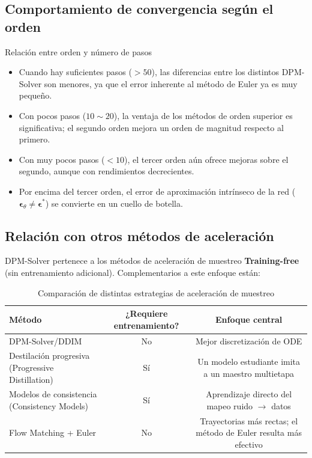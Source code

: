\documentclass[a4paper]{article}
\begin{document}
\subsection{Comportamiento de convergencia según el orden}

\begin{knowledgebox}{Relación entre orden y número de pasos}
\begin{itemize}
    \item Cuando hay suficientes pasos ($>50$), las diferencias entre los distintos DPM-Solver son menores, ya que el error inherente al método de Euler ya es muy pequeño.
    \item Con pocos pasos ($10\sim 20$), la ventaja de los métodos de orden superior es significativa; el segundo orden mejora un orden de magnitud respecto al primero.
    \item Con muy pocos pasos ($<10$), el tercer orden aún ofrece mejoras sobre el segundo, aunque con rendimientos decrecientes.
    \item Por encima del tercer orden, el error de aproximación intrínseco de la red ($\boldsymbol{\epsilon}_\theta \neq \boldsymbol{\epsilon}^*$) se convierte en un cuello de botella.
\end{itemize}
\end{knowledgebox}

\subsection{Relación con otros métodos de aceleración}

DPM-Solver pertenece a los métodos de aceleración de muestreo \textbf{Training-free} (sin entrenamiento adicional). Complementarios a este enfoque están:

\begin{table}[H]
\centering
\begin{tabular}{lcc}
\toprule
\textbf{Método} & \textbf{¿Requiere entrenamiento?} & \textbf{Enfoque central} \\
\midrule
DPM-Solver/DDIM & No & Mejor discretización de ODE \\
Destilación progresiva (Progressive Distillation) & Sí & Un modelo estudiante imita a un maestro multietapa \\
Modelos de consistencia (Consistency Models) & Sí & Aprendizaje directo del mapeo ruido $\to$ datos \\
Flow Matching + Euler & No & Trayectorias más rectas; el método de Euler resulta más efectivo \\
\bottomrule
\end{tabular}
\caption{Comparación de distintas estrategias de aceleración de muestreo}
\end{table}
\end{document}
